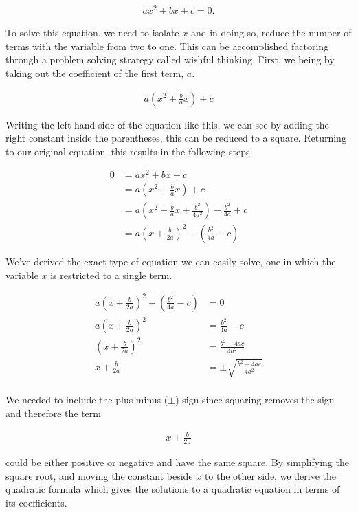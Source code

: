 \documentclass[twoside]{report}
\begin{document}
\begin{align}
	ax^2 + bx + c = 0.
\end{align}

To solve this equation, we need to isolate $x$ and in doing so, reduce the number of terms with the variable from two to one. This can be accomplished factoring through a problem solving strategy called wishful thinking. First, we being by taking out the coefficient of the first term, $a$.

\begin{align*}
	a \left( x^2 + \frac{b}{a}x \right) + c
\end{align*}

Writing the left-hand side of the equation like this, we can see by adding the right constant inside the parentheses, this can be reduced to a square. Returning to our original equation, this results in the following steps.

\begin{align*}
	0 &= ax^2 + bx + c \\
	&= a \left( x^2 + \frac{b}{a}x \right) + c \\
	&= a \left( x^2 + \frac{b}{a}x + \frac{b^2}{4a^2} \right) - \frac{b^2}{4a} + c \\
	&= a \left( x + \frac{b}{2a} \right)^2 - \left(\frac{b^2}{4a} - c \right)
\end{align*}

We've derived the exact type of equation we can easily solve, one in which the variable $x$ is restricted to a single term.

\begin{align*}
	a \left( x + \frac{b}{2a} \right)^2 - \left( \frac{b^2}{4a} -c \right) &= 0 \\
	a \left( x + \frac{b}{2a} \right)^2 &= \frac{b^2}{4a} - c \\
	\left( x + \frac{b}{2a} \right)^2 &= \frac{b^2 - 4ac}{4a^2} \\
	x + \frac{b}{2a} &= \pm \sqrt{\frac{b^2 - 4ac}{4a^2}} \\
\end{align*}

We needed to include the plus-minus ($\pm$) sign since squaring removes the sign and therefore the term

\begin{align*}
	x + \frac{b}{2a}
\end{align*}

could be either positive or negative and have the same square. By simplifying the square root, and moving the constant beside $x$ to the other side, we derive the quadratic formula which gives the solutions to a quadratic equation in terms of its coefficients.
\end{document}
